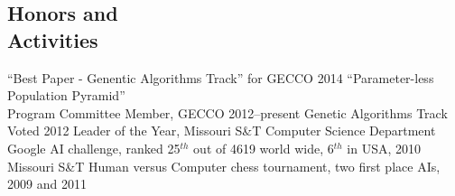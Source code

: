\documentclass[margin,line]{resume}
\begin{document}
\begin{resume}
    \section{\mysidestyle Honors and\\Activities}
    ``Best Paper - Genentic Algorithms Track'' for GECCO 2014 ``Parameter-less Population Pyramid''\\%
    Program Committee Member, GECCO 2012--present Genetic Algorithms Track \vspace{1mm}\\%
    Voted 2012 Leader of the Year, Missouri S\&T Computer Science Department \vspace{1mm}\\%
    Google AI challenge, ranked 25$^{th}$ out of 4619 world wide, 6$^{th}$ in USA, 2010 \vspace{1mm}\\%
    Missouri S\&T Human versus Computer chess tournament, two first place AIs, 2009 and 2011 \vspace{1mm}\\%
\begin{comment}    
    ACM SIG-Game Competition testing and balancing using evolving AI, 2009--present \vspace{1mm}\\%
    ACM SIG-Game first place AI, 2008          \vspace{1mm}\\%
    University of Illinois at Urbana-Champaign MechMania AI competition second place AI, 2007  \vspace{1mm}\\%
    Missouri S\&T Alumni Scholarship 2006--2010             %

    \section{\mysidestyle Programming} 
    Python, C, C++, C\#, Matlab, Linux shell scripting, \LaTeX, Java, CUDA.


\end{comment}
\end{resume}
\end{document}
